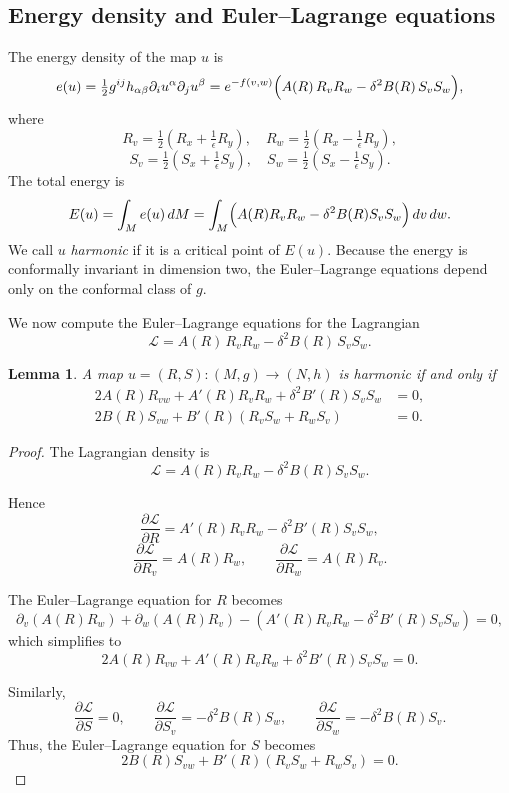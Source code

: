 \documentclass[12pt]{amsart}
\newtheorem{lemma}[theorem]{Lemma}
\begin{document}
\subsection{Energy density and Euler--Lagrange equations}

The energy density of the map $u$ is
\[
e(u) = \tfrac{1}{2} g^{ij} h_{\alpha\beta}
\partial_i u^{\alpha} \partial_j u^{\beta}
= e^{-f(v,w)}
\Bigl( A(R)\, R_v R_w - \delta^{2} B(R)\, S_v S_w \Bigr),
\]
where
\[
R_v = \tfrac{1}{2}\!\left(R_x + \tfrac{1}{\epsilon} R_y\right),
\quad
R_w = \tfrac{1}{2}\!\left(R_x - \tfrac{1}{\epsilon} R_y\right),
\]
\[
S_v = \tfrac{1}{2}\!\left(S_x + \tfrac{1}{\epsilon} S_y\right),
\quad
S_w = \tfrac{1}{2}\!\left(S_x - \tfrac{1}{\epsilon} S_y\right).
\]
The total energy is
\[
E(u) = \int_{M} e(u)\, dM
= \int_{M}
\Bigl(A(R)R_v R_w - \delta^2 B(R)S_v S_w\Bigr)\, dv\,dw.
\]
We call $u$ \textit{harmonic} if it is a critical point of $E(u)$.
Because the energy is conformally invariant in dimension two, the
Euler--Lagrange equations depend only on the conformal class of $g$.

We now compute the Euler--Lagrange equations for the Lagrangian
\[
\mathcal{L} = A(R)\, R_v R_w - \delta^{2} B(R)\, S_v S_w.
\]

\begin{lemma}\label{Euler-Lagrange}
A map $u=(R,S):(M,g)\to(N,h)$ is harmonic if and only if
\begin{align*}
2A(R) R_{vw} + A'(R) R_v R_w + \delta^{2} B'(R) S_v S_w &= 0, \\
2B(R) S_{vw} + B'(R) \left(R_v S_w + R_w S_v\right) &= 0.
\end{align*}
\end{lemma}

\begin{proof}
The Lagrangian density is
\[
\mathcal L=A(R)R_vR_w-\delta^2B(R)S_vS_w.
\]

Hence
\[
\frac{\partial \mathcal L}{\partial R}
=
A'(R)R_vR_w-\delta^2B'(R)S_vS_w,
\]
\[
\frac{\partial \mathcal L}{\partial R_v}=A(R)R_w,
\qquad
\frac{\partial \mathcal L}{\partial R_w}=A(R)R_v.
\]

The Euler--Lagrange equation for $R$ becomes
\[
\partial_v(A(R)R_w)+\partial_w(A(R)R_v)
-
\left(A'(R)R_vR_w-\delta^2B'(R)S_vS_w\right)=0,
\]
which simplifies to
\[
2A(R)R_{vw}+A'(R)R_vR_w+\delta^2B'(R)S_vS_w=0.
\]

Similarly,
\[
\frac{\partial \mathcal L}{\partial S}=0,
\qquad
\frac{\partial \mathcal L}{\partial S_v}=-\delta^2B(R)S_w,
\qquad
\frac{\partial \mathcal L}{\partial S_w}=-\delta^2B(R)S_v.
\]
Thus, the Euler--Lagrange equation for $S$ becomes
\[
2B(R)S_{vw}+B'(R)(R_vS_w+R_wS_v)=0.
\]
\end{proof}
\end{document}
